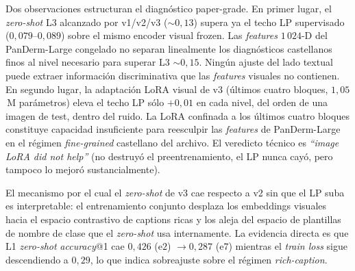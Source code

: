 Dos observaciones estructuran el diagnóstico paper-grade. En
primer lugar, el \emph{zero-shot} L3 alcanzado por v1/v2/v3
($\sim 0{,}13$) supera ya el techo LP supervisado
($0{,}079$--$0{,}089$) sobre el mismo encoder visual frozen.
Las \emph{features} $1\,024$-D del PanDerm-Large congelado no
separan linealmente los diagnósticos castellanos finos al nivel
necesario para superar L3 $\sim 0{,}15$. Ningún ajuste del lado
textual puede extraer información discriminativa que las
\emph{features} visuales no contienen. En segundo lugar, la
adaptación LoRA visual de v3 (últimos cuatro bloques,
$1{,}05$\,M parámetros) eleva el techo LP sólo $+0{,}01$ en
cada nivel, del orden de una imagen de test, dentro del ruido.
La LoRA confinada a los últimos cuatro bloques constituye
capacidad insuficiente para reesculpir las \emph{features} de
PanDerm-Large en el régimen \emph{fine-grained} castellano del
archivo. El veredicto técnico es \emph{``image LoRA did not
help''} (no destruyó el preentrenamiento, el LP nunca cayó, pero
tampoco lo mejoró sustancialmente).

El mecanismo por el cual el \emph{zero-shot} de v3 cae respecto
a v2 sin que el LP suba es interpretable: el entrenamiento
conjunto desplaza los embeddings visuales hacia el espacio
contrastivo de captions ricas y los aleja del espacio de
plantillas de nombre de clase que el \emph{zero-shot} usa
internamente. La evidencia directa es que L1 \emph{zero-shot}
\emph{accuracy}@1 cae $0{,}426$ (e$2$) $\to 0{,}287$ (e$7$)
mientras el \emph{train loss} sigue descendiendo a $0{,}29$, lo
que indica sobreajuste sobre el régimen \emph{rich-caption}.

